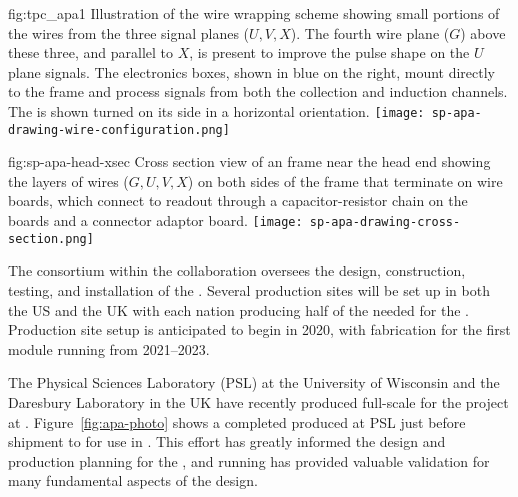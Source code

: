 \begin{dunefigure}{fig:tpc_apa1}
{Illustration of the   wire wrapping scheme showing small portions of the wires from the three signal planes ($U,V,X$). The fourth wire plane ($G$) above these three, and parallel to $X$, is present to improve the pulse shape on the $U$ plane signals. The  electronics boxes, shown in blue on the right, mount directly to the frame and process signals from both the collection and induction channels. The  is shown turned on its side in a horizontal orientation.} 
\texttt{[image: sp-apa-drawing-wire-configuration.png]} 
\end{dunefigure} 

\begin{dunefigure}{fig:sp-apa-head-xsec}
{Cross section view of an  frame near the head end showing the layers of wires ($G,U,V,X$) on both sides of the frame that terminate on wire boards, which connect to  readout  through a capacitor-resistor chain on the  boards and a connector adaptor board.} 
\texttt{[image: sp-apa-drawing-cross-section.png]} 
\end{dunefigure} 


The  consortium within the  collaboration oversees the design, construction, testing, and installation of the . Several  production sites will be set up in both the US and the UK with each nation producing  half of the  needed for the %
.  Production site setup is anticipated to begin in 2020, with  fabrication for the first \nominalmodsize {} module running from 2021--2023.  

The Physical Sciences Laboratory (PSL) at the University of Wisconsin and the Daresbury Laboratory in the UK have recently produced full-scale  for the  project at . Figure~\ref{fig:apa-photo} shows a completed  produced at PSL just before shipment to  for use in . This effort has greatly informed the design and production planning for the  , and  running has provided valuable validation for many fundamental aspects of the   design. 


